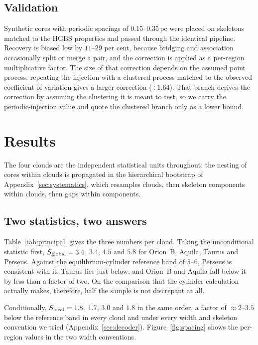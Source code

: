 \documentclass[usenatbib,twoside,twocolumn]{mnras}
\begin{document}
\subsection{Validation}
\label{sec:injection_recovery}

Synthetic cores with periodic spacings of $0.15$--$0.35$\,pc were placed on skeletons matched to the HGBS properties and passed through the identical pipeline. Recovery is biased low by $11$--$29$ per cent, because bridging and association occasionally split or merge a pair, and the correction is applied as a per-region multiplicative factor. The size of that correction depends on the assumed point process: repeating the injection with a clustered process matched to the observed coefficient of variation gives a larger correction ($\div1.64$). That branch derives the correction by assuming the clustering it is meant to test, so we carry the periodic-injection value and quote the clustered branch only as a lower bound.

\section{Results}
\label{sec:results}

The four clouds are the independent statistical units throughout; the nesting of cores within clouds is propagated in the hierarchical bootstrap of Appendix~\ref{sec:systematics}, which resamples clouds, then skeleton components within clouds, then gaps within components.

\subsection{Two statistics, two answers}
\label{sec:twostats}

Table~\ref{tab:principal} gives the three numbers per cloud. Taking the unconditional statistic first, $S_{\rm global}=3.4$, $3.4$, $4.5$ and $5.8$ for Orion~B, Aquila, Taurus and Perseus. Against the equilibrium-cylinder reference band of $5$--$6$, Perseus is consistent with it, Taurus lies just below, and Orion~B and Aquila fall below it by less than a factor of two. On the comparison that the cylinder calculation actually makes, therefore, half the sample is not discrepant at all.

Conditionally, $S_{\rm local}=1.8$, $1.7$, $3.0$ and $1.8$ in the same order, a factor of $\approx2$--$3.5$ below the reference band in every cloud and under every width and skeleton convention we tried (Appendix~\ref{sec:decoder}). Figure~\ref{fig:spacing} shows the per-region values in the two width conventions.
\end{document}

